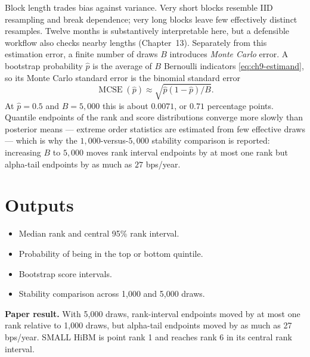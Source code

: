 Block length trades bias against variance. Very short blocks resemble IID
resampling and break dependence; very long blocks leave few effectively
distinct resamples. Twelve months is substantively interpretable here, but
a defensible workflow also checks nearby lengths (Chapter~13). Separately
from this estimation error, a finite number of draws $B$ introduces
\emph{Monte Carlo} error. A bootstrap probability $\hat p$ is the average of
$B$ Bernoulli indicators \eqref{eq:ch9-estimand}, so its Monte Carlo
standard error is the binomial standard error
\begin{equation}\label{eq:ch9-mcse}
\operatorname{MCSE}(\hat p) \approx \sqrt{\hat p(1-\hat p)/B}.
\end{equation}
At $\hat p=0.5$ and $B=5{,}000$ this is about $0.0071$, or $0.71$ percentage
points. Quantile endpoints of the rank and score distributions converge
more slowly than posterior means --- extreme order statistics are estimated
from few effective draws --- which is why the $1{,}000$-versus-$5{,}000$
stability comparison is reported: increasing $B$ to $5{,}000$ moves rank
interval endpoints by at most one rank but alpha-tail endpoints by as much
as $27$ bps/year.

\hypertarget{outputs}{%
\section{Outputs}\label{outputs}}

\begin{itemize}
\tightlist
\item
  Median rank and central 95\% rank interval.
\item
  Probability of being in the top or bottom quintile.
\item
  Bootstrap score intervals.
\item
  Stability comparison across 1,000 and 5,000 draws.
\end{itemize}

\textbf{Paper result.} With 5,000 draws, rank-interval endpoints moved
by at most one rank relative to 1,000 draws, but alpha-tail endpoints
moved by as much as 27 bps/year. SMALL HiBM is point rank 1 and reaches
rank 6 in its central rank interval.


